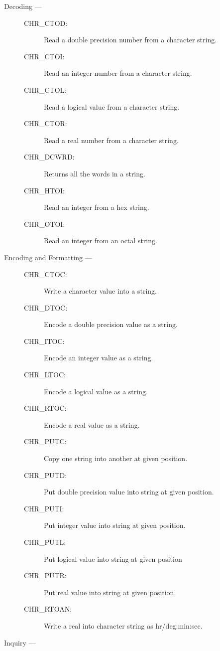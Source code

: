 \begin{description}

\item [Decoding ---]

\begin{description}
\item [CHR\_CTOD:]  Read a double precision number from a character string.
\item [CHR\_CTOI:]  Read an integer number from a character string.
\item [CHR\_CTOL:]  Read a logical value from a character string.
\item [CHR\_CTOR:]  Read a real number from a character string.
\item [CHR\_DCWRD:]  Returns all the words in a string.
\item [CHR\_HTOI:]  Read an integer from a hex string.
\item [CHR\_OTOI:]  Read an integer from an octal string.
\end{description}

\item [Encoding and Formatting ---]

\begin{description}
\item [CHR\_CTOC:]  Write a character value into a string.
\item [CHR\_DTOC:]  Encode a double precision value as a string.
\item [CHR\_ITOC:]  Encode an integer value as a string.
\item [CHR\_LTOC:]  Encode a logical value as a string.
\item [CHR\_RTOC:]  Encode a real value as a string.
\item [CHR\_PUTC:]  Copy one string into another at given position.
\item [CHR\_PUTD:]  Put double precision value into string at given position.
\item [CHR\_PUTI:]  Put integer value into string at given position.
\item [CHR\_PUTL:]  Put logical value into string at given position
\item [CHR\_PUTR:]  Put real value into string at given position.
\item [CHR\_RTOAN:]  Write a real into character string as hr/deg:min:sec.
\end{description}

\item [Inquiry ---]


\end{description}
